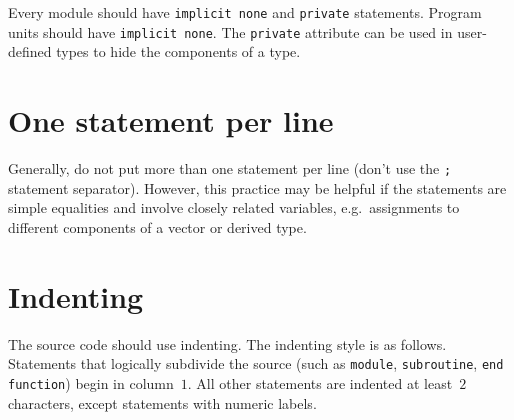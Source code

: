 \documentclass[11pt,twoside,a4paper]{report}
\newcommand{\T}[1]{{\tt #1}}
\begin{document}
Every module should have \verb|implicit none| and \verb|private|
statements. Program units should have \verb|implicit none|.
The \verb|private| attribute can be used in user-defined types
to hide the components of a type.

\section{One statement per line}

Generally, do not put more than one statement per line (don't use the \verb|;|
statement separator). However, this practice may be helpful if the statements are
simple equalities and involve closely related variables, e.g.\ assignments to different components
of a vector or derived type.


\section{Indenting}

The source code should use indenting.
The indenting style is as follows. Statements that logically subdivide
the source (such as \T{module}, \T{subroutine}, \T{end function}) begin in column~$1$.
All other statements are indented at least~$2$ characters, except statements
with numeric labels.
\end{document}
